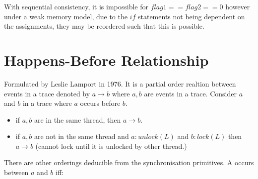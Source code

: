 \documentclass{report}
\begin{document}
        \begin{minipage}{0.5 \textwidth}
        \end{minipage}
        \begin{minipage}{0.5 \textwidth}
        \end{minipage}
        With sequential consistency, it is impossible for $flag1 == flag2 == 0$ however under a weak memory model, due to the $if$ statements not being dependent on the assignments, they may be reordered such that this is possible.
    
    \section*{Happens-Before Relationship}
        Formulated by Leslie Lamport in 1976. It is a partial order realtion between events in a trace denoted by $a \to b$ where $a,b$ are events in a trace.
        Consider $a$ and $b$ in a trace where $a$ occurs before $b$.
        \begin{itemize}
            \item if $a,b$ are in the same thread, then $a \to b$.
            \item if $a,b$ are not in the same thread and $a : unlock(L)$ and $b : lock(L)$ then $a \to b$ (cannot lock until it is unlocked by other thread.)
        \end{itemize}
        There are other orderings deducible from the synchronisation primitives.
        A  occurs between $a$ and $b$ iff:
        \begin{minipage}{0.5 \textwidth}
        \end{minipage}
\end{document}
